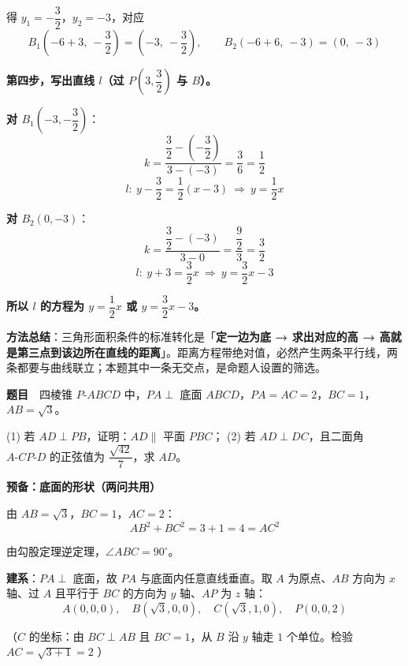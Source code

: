 得 $y_1=-\dfrac32$，$y_2=-3$，对应
\[B_1\left(-6+3,\ -\frac32\right)=\left(-3,\ -\frac32\right),\qquad B_2\left(-6+6,\ -3\right)=(0,\ -3)\]

\textbf{第四步，写出直线 $l$（过 $P\left(3,\dfrac32\right)$ 与 $B$）。}

\textbf{对 $B_1\left(-3,-\dfrac32\right)$}：
\[k=\frac{\dfrac32-\left(-\dfrac32\right)}{3-(-3)}=\frac36=\frac12\]
\[l:\ y-\frac32=\frac12(x-3)\ \Longrightarrow\ y=\frac12x\]

\textbf{对 $B_2(0,-3)$}：
\[k=\frac{\dfrac32-(-3)}{3-0}=\frac{\dfrac92}3=\frac32\]
\[l:\ y+3=\frac32x\ \Longrightarrow\ y=\frac32x-3\]

\textbf{所以 $l$ 的方程为 $y=\dfrac12x$ 或 $y=\dfrac32x-3$。}

\begin{gktip}
\textbf{方法总结}：三角形面积条件的标准转化是「\textbf{定一边为底 → 求出对应的高 → 高就是第三点到该边所在直线的距离}」。距离方程带绝对值，必然产生两条平行线，两条都要与曲线联立；本题其中一条无交点，是命题人设置的筛选。
\end{gktip}

\par\medskip


\textbf{题目}　四棱锥 $P\text{-}ABCD$ 中，$PA\perp$ 底面 $ABCD$，$PA=AC=2$，$BC=1$，$AB=\sqrt3$。

\begin{center}\end{center}

  (1) 若 $AD\perp PB$，证明：$AD\parallel$ 平面 $PBC$；
  (2) 若 $AD\perp DC$，且二面角 $A\text{-}CP\text{-}D$ 的正弦值为 $\dfrac{\sqrt{42}}7$，求 $AD$。

\par\medskip

\textbf{预备：底面的形状（两问共用）}

由 $AB=\sqrt3$，$BC=1$，$AC=2$：
\[AB^{2}+BC^{2}=3+1=4=AC^{2}\]

由勾股定理逆定理，$\angle ABC=90^{\circ}$。

\textbf{建系}：$PA\perp$ 底面，故 $PA$ 与底面内任意直线垂直。取 $A$ 为原点、$AB$ 方向为 $x$ 轴、过 $A$ 且平行于 $BC$ 的方向为 $y$ 轴、$AP$ 为 $z$ 轴：
\[A(0,0,0),\quad B\left(\sqrt3,0,0\right),\quad C\left(\sqrt3,1,0\right),\quad P(0,0,2)\]

（$C$ 的坐标：由 $BC\perp AB$ 且 $BC=1$，从 $B$ 沿 $y$ 轴走 $1$ 个单位。检验 $AC=\sqrt{3+1}=2$ ）

